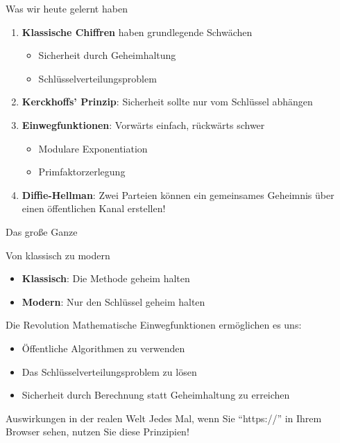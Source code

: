 \documentclass[handout]{beamer}
\begin{document}
\begin{frame}{Was wir heute gelernt haben}
\begin{enumerate}
    \item \textbf{Klassische Chiffren} haben grundlegende Schwächen
    \begin{itemize}
        \item Sicherheit durch Geheimhaltung
        \item Schlüsselverteilungsproblem
    \end{itemize}

    \pause

    \item \textbf{Kerckhoffs' Prinzip}: Sicherheit sollte nur vom Schlüssel abhängen

    \pause

    \item \textbf{Einwegfunktionen}: Vorwärts einfach, rückwärts schwer
    \begin{itemize}
        \item Modulare Exponentiation
        \item Primfaktorzerlegung
    \end{itemize}

    \pause

    \item \textbf{Diffie-Hellman}: Zwei Parteien können ein gemeinsames Geheimnis über einen öffentlichen Kanal erstellen!
\end{enumerate}
\end{frame}

\begin{frame}{Das große Ganze}
\begin{block}{Von klassisch zu modern}
\begin{itemize}
    \item \textbf{Klassisch}: Die Methode geheim halten
    \item \textbf{Modern}: Nur den Schlüssel geheim halten
\end{itemize}
\end{block}

\pause

\begin{block}{Die Revolution}
Mathematische Einwegfunktionen ermöglichen es uns:
\begin{itemize}
    \item Öffentliche Algorithmen zu verwenden
    \item Das Schlüsselverteilungsproblem zu lösen
    \item Sicherheit durch Berechnung statt Geheimhaltung zu erreichen
\end{itemize}
\end{block}

\pause

\begin{exampleblock}{Auswirkungen in der realen Welt}
Jedes Mal, wenn Sie ``https://'' in Ihrem Browser sehen, nutzen Sie diese Prinzipien!
\end{exampleblock}
\end{frame}
\end{document}
